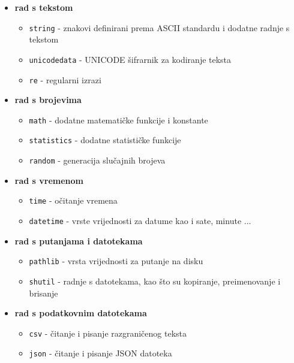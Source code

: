 \begin{itemize}
    
    \item \textbf{rad s tekstom}
    \begin{itemize}
        \item \texttt{string} - znakovi definirani prema ASCII standardu i dodatne radnje s tekstom
        \item \texttt{unicodedata} - UNICODE šifrarnik za kodiranje teksta
        \item \texttt{re} - regularni izrazi
    \end{itemize}

    \item \textbf{rad s brojevima}
    \begin{itemize}
        \item \texttt{math} - dodatne matematičke funkcije i konstante
        \item \texttt{statistics} - dodatne statističke funkcije
        \item \texttt{random} - generacija slučajnih brojeva
    \end{itemize}

    \item \textbf{rad s vremenom}
    \begin{itemize}
        \item \texttt{time} - očitanje vremena        
        \item \texttt{datetime} - vrste vrijednosti za datume kao i sate, minute ...
    \end{itemize}

    \item \textbf{rad s putanjama i datotekama}
    \begin{itemize}
        \item \texttt{pathlib} - vrsta vrijednosti za putanje na disku
        \item \texttt{shutil} - radnje s datotekama, kao što su kopiranje, preimenovanje i brisanje
    \end{itemize}

    \item \textbf{rad s podatkovnim datotekama}
    \begin{itemize}
        \item \texttt{csv} - čitanje i pisanje razgraničenog teksta
        \item \texttt{json} - čitanje i pisanje JSON datoteka
    \end{itemize}


\end{itemize}
